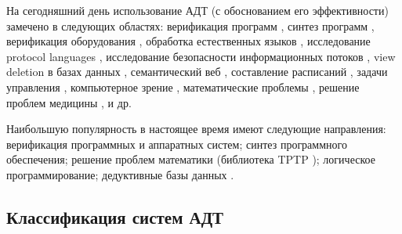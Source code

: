 На сегодняшний день использование АДТ (с обоснованием его эффективности) замечено в следующих областях: верификация программ \cite{promsky,ATP_Ver2,keyproj}, синтез программ \cite{atpsoft, Butakov1}, верификация оборудования \cite{hardver,ACL2}, обработка естественных языков \cite{ATP_NLP}, исследование protocol languages \cite{protolan}, исследование безопасности информационных потоков \cite{ATP_Flow}, view deletion в базах данных \cite{ATP_DB}, семантический веб \cite{semweb,tptp}, составление расписаний \cite{tptp}, задачи управления \cite{ICDS2000}, компьютерное зрение \cite{ATP_Vision}, математические проблемы \cite{tptp, McCuneRob}, решение проблем медицины \cite{med1, tptp},  и др.

Наибольшую популярность в настоящее время имеют следующие направления: верификация программных и аппаратных систем; синтез программного обеспечения; решение проблем математики (библиотека TPTP \cite{tptp}); логическое программирование; дедуктивные базы данных \cite{ontobox}.


\subsection{Классификация систем АДТ}

